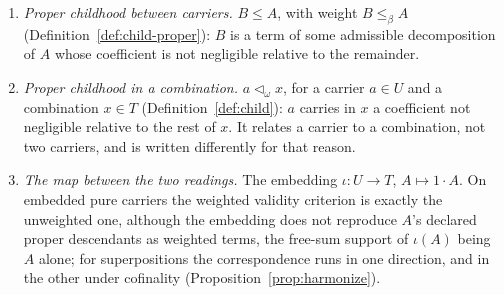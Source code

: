 \begin{enumerate}
\item[(D6)] \emph{Proper childhood between carriers.} $B \le A$, with weight $B \le_\beta A$ (Definition~\ref{def:child-proper}): $B$ is a term of some admissible decomposition of $A$ whose coefficient is not negligible relative to the remainder.
\item[(D7)] \emph{Proper childhood in a combination.} $a \lhd_\omega x$, for a carrier $a \in U$ and a combination $x \in T$ (Definition~\ref{def:child}): $a$ carries in $x$ a coefficient not negligible relative to the rest of $x$. It relates a carrier to a combination, not two carriers, and is written differently for that reason.
\item[(D8)] \emph{The map between the two readings.} The embedding $\iota: U \to T$, $A \mapsto 1 \cdot A$. On embedded pure carriers the weighted validity criterion is exactly the unweighted one, although the embedding does not reproduce $A$'s declared proper descendants as weighted terms, the free-sum support of $\iota(A)$ being $A$ alone; for superpositions the correspondence runs in one direction, and in the other under cofinality (Proposition~\ref{prop:harmonize}).
\end{enumerate}


